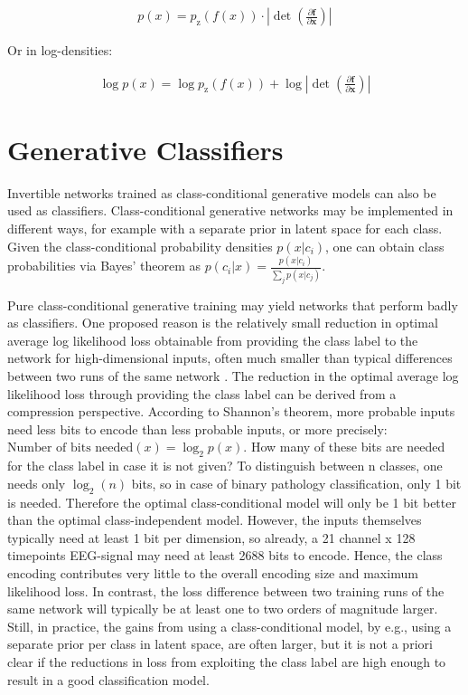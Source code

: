 \begin{align}
p(x) = p_\textrm{z}(f(x)) \cdot | \det \left( \frac{\partial \mathbf{f}}{\partial \mathbf{x}} \right)|
\end{align}

Or in log-densities:

\begin{align}
\log p(x) = \log p_\textrm{z}(f(x)) + \log |\det \left( \frac{\partial \mathbf{f}}{\partial \mathbf{x}} \right)|
\end{align}

\section{Generative Classifiers}\label{generative-classifiers}

    Invertible networks trained as class-conditional generative models can
also be used as classifiers. Class-conditional generative networks may
be implemented in different ways, for example with a separate prior in
latent space for each class. Given the class-conditional probability
densities $p(x|c_i)$, one can obtain class probabilities via Bayes'
theorem as $p(c_i|x)=\frac{p(x|c_i)}{\sum_jp(x|c_j)}$.

Pure class-conditional generative training may yield networks that
perform badly as classifiers. One proposed reason is the relatively
small reduction in optimal average log likelihood loss obtainable from
providing the class label to the network for high-dimensional inputs,
often much smaller than typical differences between two runs of the same
network \citep{DBLP:journals/corr/TheisOB15}. The reduction
in the optimal average log likelihood loss through providing the class
label can be derived from a compression perspective. According to
Shannon's theorem, more probable inputs need less bits to encode than
less probable inputs, or more precisely: 
$\textrm{Number of bits needed}(x) = \log_2 p(x)$. How many of these
bits are needed for the class label in case it is not given? To
distinguish between n classes, one needs only $\log_2(n)$ bits, so in
case of binary pathology classification, only 1 bit is needed. Therefore
the optimal class-conditional model will only be 1 bit better than the
optimal class-independent model. However, the inputs themselves
typically need at least 1 bit per dimension, so already, a 21 channel x
128 timepoints EEG-signal may need at least 2688 bits to encode. Hence,
the class encoding contributes very little to the overall encoding size
and maximum likelihood loss. In contrast, the loss difference between
two training runs of the same network will typically be at least one to
two orders of magnitude larger. Still, in practice, the gains from using
a class-conditional model, by e.g., using a separate prior per class in
latent space, are often larger, but it is not a priori clear if the
reductions in loss from exploiting the class label are high enough to
result in a good classification model.

